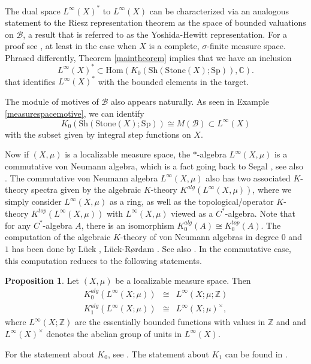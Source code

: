 \documentclass[10pt]{amsart}
\theoremstyle{definition}
\newtheorem{proposition}[theorem]{Proposition}
\begin{document}
The dual space $L^\infty(X)^*$ to $L^\infty(X)$ can be characterized via an analogous statement to the Riesz representation theorem as the space of bounded valuations on $\mathcal{B}$, a result that is referred to as the Yoshida-Hewitt representation. For a proof see \cite{Toland2020}, at least in the case when $X$ is a complete, $\sigma$-finite measure space. Phrased differently, Theorem \ref{maintheorem} implies that we have an inclusion
$$L^\infty(X)^* \subset \mathrm{Hom}( K_0( \mathrm{Sh}(\mathrm{Stone}(X);\mathrm{Sp}) ), \mathbb{C} ).$$
that identifies $L^\infty(X)^*$ with the bounded elements in the target.

The module of motives of $\mathcal{B}$ also appears naturally. As seen in Example \ref{measurespacemotive}, we can identify 
$$K_0( \mathrm{Sh}(\mathrm{Stone}(X);\mathrm{Sp}) ) \cong M(\mathcal{B}) \subset L^\infty(X)$$
with the subset given by integral step functions on $X$.


Now if $(X,\mu)$ is a localizable measure space, the $*$-algebra $L^\infty(X,\mu)$ is a commutative von Neumann algebra, which is a fact going back to Segal \cite{SegalI.E.1951EoMS}, see also \cite[Theorem 243G]{fremlin2000measure}. The commutative von Neumann algebra $L^\infty(X,\mu)$ also has two associated $K$-theory spectra given by the algebraic $K$-theory $K^{alg}(L^\infty(X,\mu))$, where we simply consider $L^\infty(X,\mu)$ as a ring, as well as the topological/operator $K$-theory $K^{top}(L^\infty(X,\mu))$ with $L^\infty(X,\mu)$ viewed as a $C^*$-algebra. Note that for any $C^*$-algebra $A$, there is an isomorphism $K^{alg}_0(A) \cong K^{top}_0(A)$. The computation of the algebraic $K$-theory of von Neumann algebras in degree $0$ and $1$ has been done by Lück \cite{Lück2002}, Lück-R{\o}rdam \cite{Lueck1993}. See also \cite{reich_operator}. In the commutative case, this computation reduces to the following statements. 
\begin{proposition}
Let $(X,\mu)$ be a localizable measure space. Then
$$\begin{array}{rcl} K^{alg}_0( L^\infty(X;\mu) ) &\cong & L^\infty(X;\mu; \mathbb{Z}) \\
K^{alg}_1( L^\infty(X;\mu) ) &\cong & L^\infty(X;\mu)^\times,
\end{array}$$
where $L^\infty(X; \mathbb{Z})$ are the essentially bounded functions with values in $\mathbb{Z}$ and and $L^\infty(X)^\times$ denotes the abelian group of units in $L^\infty(X)$.
\end{proposition}

For the statement about $K_0$, see \cite[Theorem 9.13 and Example 9.14.]{Lück2002}. The statement about $K_1$ can be found in \cite[Theorem 2.1]{Lueck1993}. 
\end{document}
